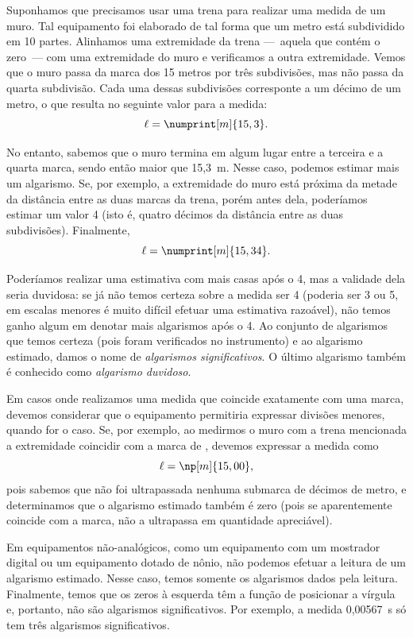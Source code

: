 Suponhamos que precisamos usar uma trena para realizar uma medida de um muro. Tal equipamento foi elaborado de tal forma que um metro está subdividido em 10 partes. Alinhamos uma extremidade da trena ---~aquela que contém o zero~--- com uma extremidade do muro e verificamos a outra extremidade. Vemos que o muro passa da marca dos 15 metros por três subdivisões, mas não passa da quarta subdivisão. Cada uma dessas subdivisões corresponte a um décimo de um metro, o que resulta no seguinte valor para a medida:
\begin{equation}
     \ell = \numprint[m]{15,3}.
\end{equation}

\noindent{}No entanto, sabemos que o muro termina em algum lugar entre a terceira e a quarta marca, sendo então maior que 15,3~m. Nesse caso, podemos estimar mais um algarismo. Se, por exemplo, a extremidade do muro está próxima da metade da distância entre as duas marcas da trena, porém antes dela, poderíamos estimar um valor 4 (isto é, quatro décimos da distância entre as duas subdivisões). Finalmente,
\begin{equation}
     \ell = \numprint[m]{15,34}.
\end{equation}

Poderíamos realizar uma estimativa com mais casas após o 4, mas a validade dela seria duvidosa: se já não temos certeza sobre a medida ser 4 (poderia ser 3 ou 5, em escalas menores é muito difícil efetuar uma estimativa razoável), não temos ganho algum em denotar mais algarismos após o 4. Ao conjunto de algarismos que temos certeza (pois foram verificados no instrumento) e ao algarismo estimado, damos o nome de \emph{algarismos significativos}. O último algarismo também é conhecido como \emph{algarismo duvidoso}.

Em casos onde realizamos uma medida que coincide exatamente com uma marca, devemos considerar que o equipamento permitiria expressar divisões menores, quando for o caso. Se, por exemplo, ao medirmos o muro com a trena mencionada a extremidade coincidir com a marca de , devemos expressar a medida como
\begin{equation}
	\ell = \np[m]{15,00},
\end{equation}
%
pois sabemos que não foi ultrapassada nenhuma submarca de décimos de metro, e determinamos que o algarismo estimado também é zero (pois se aparentemente coincide com a marca, não a ultrapassa em quantidade apreciável).

Em equipamentos não-analógicos, como um equipamento com um mostrador digital ou um equipamento dotado de nônio, não podemos efetuar a leitura de um algarismo estimado. Nesse caso, temos somente os algarismos dados pela leitura. Finalmente, temos que os zeros à esquerda têm a função de posicionar a vírgula e, portanto, não são algarismos significativos. Por exemplo, a medida 0,00567~s só tem três algarismos significativos.


